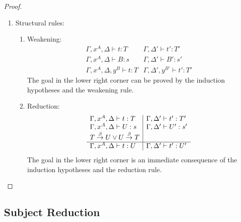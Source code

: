 \begin{theorem}
\begin{proof}
\begin{enumerate}
            \item Structural rules:
            \begin{enumerate}
                \item Weakening:
                $$
                \begin{array}{l|l}
                    \Gamma,x^A,\Delta \vdash t: T
                    &
                    \Gamma,\Delta' \vdash t' : T'
                    \\
                    \Gamma,x^A,\Delta \vdash B: s
                    &
                    \Gamma,\Delta' \vdash B' : s'
                    \\
                    \hline
                    \Gamma,x^A,\Delta,y^B \vdash t : T
                    &
                    \Gamma,\Delta',y^{B'} \vdash t' : T'
                \end{array}
                $$
                The goal in the lower right corner can be proved by the
                    induction hypotheses and the weakening rule.

                \item Reduction:
                $$
                \begin{array}{l|l}
                    \Gamma,x^A,\Delta \vdash t : T
                    &
                    \Gamma,\Delta' \vdash t' : T'
                    \\
                    \Gamma,x^A,\Delta \vdash U : s
                    &
                    \Gamma,\Delta' \vdash U' : s'
                    \\
                    T \stackrel{\beta}{\to} U \lor U \stackrel{\beta}{\to} T
                    \\
                    \hline
                    \Gamma,x^A,\Delta \vdash t : U
                    &
                    \Gamma,\Delta' \vdash t' : U'
                \end{array}
                $$
                The goal in the lower right corner is an immediate consequence
                of the induction hypotheses and the reduction rule.
            \end{enumerate}

        \end{enumerate}
    \end{proof}
\end{theorem}







\subsection{Subject Reduction}


